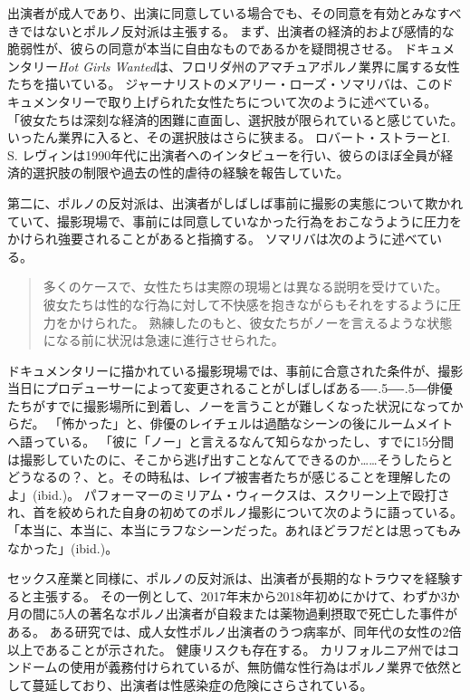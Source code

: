 \documentclass[paper=a4,book,openany]{jlreq}
\newcommand{\ig}[1]{}           %
\def\DDASH{―\kern-.5\zw―\kern-.5\zw―}
\begin{document}
出演者が成人であり、出演に同意している場合でも、その同意を有効とみなすべきではないとポルノ反対派は主張する。
まず、出演者の経済的および感情的な脆弱性が、彼らの同意が本当に自由なものであるかを疑問視させる。
ドキュメンタリー\emph{Hot Girls Wanted}は、フロリダ州のアマチュアポルノ業界に属する女性たちを描いている。
ジャーナリストのメアリー・ローズ・ソマリバは、このドキュメンタリーで取り上げられた女性たちについて次のように述べている。
「彼女たちは深刻な経済的困難に直面し、選択肢が限られていると感じていた。
いったん業界に入ると、その選択肢はさらに狭まる\citep{somarriba15:_porn_indus_is_abusiv_these}。
ロバート・ストラーとI. S. レヴィンは1990年代に出演者へのインタビューを行い、彼らのほぼ全員が経済的選択肢の制限や過去の性的虐待の経験を報告していた\citep{stoller93:_comin_attrac}。

第二に、ポルノの反対派は、出演者がしばしば事前に撮影の実態について欺かれていて、撮影現場で、事前には同意していなかった行為をおこなうように圧力をかけられ強要されることがあると指摘する。
ソマリバは次のように述べている。

\begin{quote}
多くのケースで、女性たちは実際の現場とは異なる説明を受けていた。
彼女たちは性的な行為に対して不快感を抱きながらもそれをするように圧力をかけられた。
熟練したのもと、彼女たちがノーを言えるような状態になる前に状況は急速に進行させられた。
\citep{somarriba15:_porn_indus_is_abusiv_these}
\end{quote}

ドキュメンタリーに描かれている撮影現場では、事前に合意された条件が、撮影当日にプロデューサーによって変更されることがしばしばある{\DDASH}俳優たちがすでに撮影場所に到着し、ノーを言うことが難しくなった状況になってからだ。
「怖かった」と、俳優のレイチェルは過酷なシーンの後にルームメイトへ語っている。
「彼に「ノー」と言えるなんて知らなかったし、すでに15分間は撮影していたのに、そこから逃げ出すことなんてできるのか……そうしたらとどうなるの？、と。その時私は、レイプ被害者たちが感じることを理解したのよ」(ibid.)。
パフォーマーのミリアム・ウィークスは、スクリーン上で殴打され、首を絞められた自身の初めてのポルノ撮影について次のように語っている。
「本当に、本当に、本当にラフなシーンだった。あれほどラフだとは思ってもみなかった」(ibid.)。

セックス産業と同様に、ポルノの反対派は、出演者が長期的なトラウマを経験すると主張する。
その一例として、2017年末から2018年初めにかけて、わずか3か月の間に5人の著名なポルノ出演者が自殺または薬物過剰摂取で死亡した事件がある。
ある研究では、成人女性ポルノ出演者のうつ病率が、同年代の女性の2倍以上であることが示された\citep{grudzen01:_compar_mental_healt_femal_adult}。
健康リスクも存在する。
カリフォルニア州ではコンドームの使用が義務付けられているが、無防備な性行為はポルノ業界で依然として蔓延しており、出演者は性感染症\ig{(STI)}の危険にさらされている\citep{coyne09:_sexual_healt_adult_workin_pornog_films}。
\end{document}
